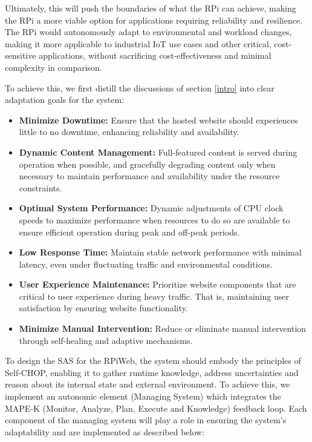 \documentclass[conference]{IEEEtran}
\begin{document}
Ultimately, this will push the boundaries of what the RPi can achieve, making the RPi a more viable option for applications requiring reliability and resilience. The RPi would autonomously adapt to environmental and workload changes, making it more applicable to industrial IoT use cases and other critical, cost-sensitive applications, without sacrificing cost-effectiveness and minimal complexity in comparison.

To achieve this, we first distill the discussions of section \ref{intro} into clear adaptation goals for the system:

\begin{itemize}
    \item \textbf{Minimize Downtime:}
          Ensure that the hosted website should experiences little to no downtime, enhancing reliability and availability.
    \item \textbf{Dynamic Content Management:}
          Full-featured content is served during operation when possible, and gracefully degrading content only when necessary to maintain performance and availability under the resource constraints.
    \item \textbf{Optimal System Performance:}
          Dynamic adjustments of CPU clock speeds to maximize performance when resources to do so are available to ensure efficient operation during peak and off-peak periods.
    \item \textbf{Low Response Time:} Maintain stable network performance with minimal latency, even under fluctuating traffic and environmental conditions.
    \item \textbf{User Experience Maintenance:}
          Prioritize website components that are critical to user experience during heavy traffic. That is, maintaining user satisfaction by ensuring website functionality.
    \item \textbf{Minimize Manual Intervention:}
          Reduce or eliminate manual intervention through self-healing and adaptive mechanisms.
\end{itemize}

To design the SAS for the RPiWeb, the system should embody the principles of Self-CHOP, enabling it to gather runtime knowledge, address uncertainties and reason about its internal state and external environment. To achieve this, we implement an autonomic element (Managing System) which integrates the MAPE-K (Monitor, Analyze, Plan, Execute and Knowledge) feedback loop. Each component of the managing system will play a role in ensuring the system's adaptability and are implemented as described below:
\end{document}
